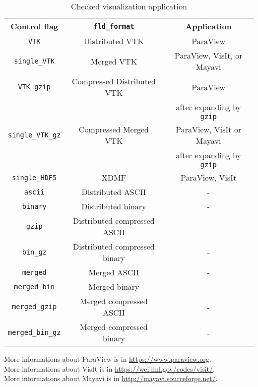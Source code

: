\begin{table}[htp]
\caption{Checked visualization application}
\label{table:Viz_app}
\begin{center} 
\begin{tabular}{|c|c|c|}
\hline
Control flag & \verb|fld_format| & Application \\ \hline \hline
\verb|VTK| & Distributed VTK & ParaView \\ \hline
\verb|single_VTK| & Merged VTK & ParaView, VisIt, or Mayavi \\ \hline
\verb|VTK_gzip| & Compressed Distributed VTK & ParaView \\
 & & after expanding by {\tt gzip} \\ \hline
\verb|single_VTK_gz| & Compressed Merged VTK & ParaView, VisIt or Mayavi \\
 & &  after expanding by {\tt gzip} \\ \hline
\verb|single_HDF5| & XDMF   & ParaView, VisIt   \\ \hline
\verb|ascii| & Distributed ASCII & - \\
\verb|binary| & Distributed binary & - \\
\verb|gzip| & Distributed compressed ASCII & - \\
\verb|bin_gz| & Distributed compressed binary & - \\
\verb|merged| & Merged ASCII & - \\
\verb|merged_bin| & Merged binary & - \\
\verb|merged_gzip| & Merged compressed ASCII & - \\
\verb|merged_bin_gz| & Merged compressed binary & - \\ \hline

\end{tabular}
\end{center}
More informations about ParaView is in \url{https://www.paraview.org}. \\
More informations about VisIt is in \url{https://wci.llnl.gov/codes/visit/}. \\
More informations about Mayavi is in \url{http://mayavi.sourceforge.net/}. \\
\end{table}
%

